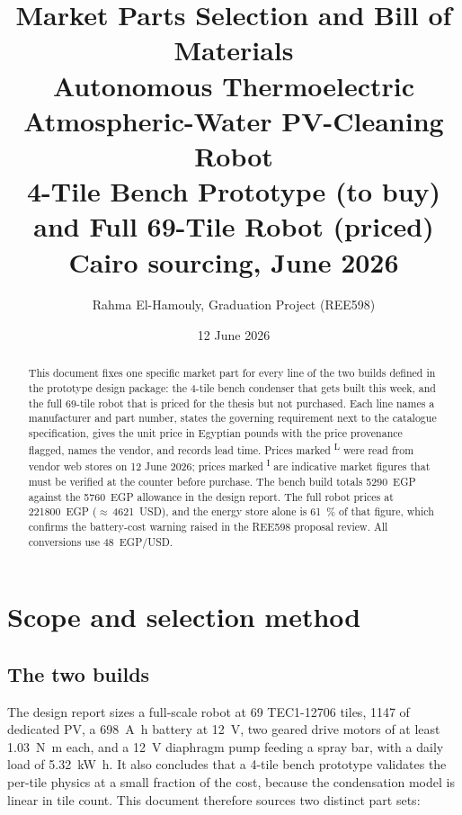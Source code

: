\documentclass[11pt,a4paper]{article}
\title{\textbf{Market Parts Selection and Bill of Materials}\\[0.4em]
\large Autonomous Thermoelectric Atmospheric-Water PV-Cleaning Robot\\[0.2em]
\normalsize 4-Tile Bench Prototype (to buy) and Full 69-Tile Robot (priced)\\
Cairo sourcing, June 2026}
\author{Rahma El-Hamouly, Graduation Project (REE598)}
\date{12 June 2026}
\newcommand{\liveflag}{\textsuperscript{L}}
\newcommand{\indflag}{\textsuperscript{I}}
\begin{document}
\maketitle

\begin{abstract}
\noindent
This document fixes one specific market part for every line of the two
builds defined in the prototype design package: the 4-tile bench condenser
that gets built this week, and the full 69-tile robot that is priced for the
thesis but not purchased. Each line names a manufacturer and part number,
states the governing requirement next to the catalogue specification, gives
the unit price in Egyptian pounds with the price provenance flagged, names
the vendor, and records lead time. Prices marked \liveflag{} were read from
vendor web stores on 12 June 2026; prices marked \indflag{} are indicative
market figures that must be verified at the counter before purchase. The
bench build totals \num{5290}~EGP against the \num{5760}~EGP allowance in
the design report. The full robot prices at \num{221800}~EGP
($\approx$\,\num{4621}~USD), and the energy store alone is \SI{61}{\percent}
of that figure, which confirms the battery-cost warning raised in the REE598
proposal review. All conversions use \num{48}~EGP/USD.
\end{abstract}

\tableofcontents
\newpage

\section{Scope and selection method}

\subsection{The two builds}
The design report \cite{nasa_power,kazem2023soiling} sizes a full-scale
robot at 69 TEC1-12706 tiles, \SI{1147}{\Wp} of dedicated PV, a
\SI{698}{\ampere\hour} battery at \SI{12}{\volt}, two geared drive motors of
at least \SI{1.03}{\newton\metre} each, and a \SI{12}{\volt} diaphragm pump
feeding a spray bar, with a daily load of \SI{5.32}{\kilo\watt\hour}. It
also concludes that a 4-tile bench prototype validates the per-tile physics
at a small fraction of the cost, because the condensation model is linear in
tile count. This document therefore sources two distinct part sets:
\end{document}
